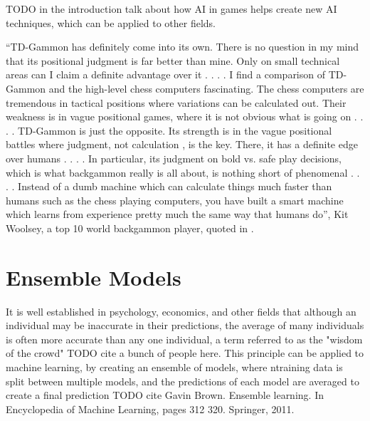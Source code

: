 TODO in the introduction talk about how AI in games helps create new AI techniques, which can be applied to other fields.

“TD-Gammon has definitely come into its own. There is no question in my mind that its positional judgment is far better than mine.
Only on small technical areas can I claim a definite advantage over
it . . . . I find a comparison of TD-Gammon and the high-level chess
computers fascinating. The chess computers are tremendous in
tactical positions where variations can be calculated out. Their
weakness is in vague positional games, where it is not obvious
what is going on . . . . TD-Gammon is just the opposite. Its strength
is in the vague positional battles where judgment, not calculation ,
is the key. There, it has a definite edge over humans . . . . In particular, its judgment on bold vs. safe play decisions, which is what
backgammon really is all about, is nothing short of phenomenal . . . .
Instead of a dumb machine which can calculate things much faster
than humans such as the chess playing computers, you have built
a smart machine which learns from experience pretty much the
same way that humans do”, Kit Woolsey, a top 10 world backgammon player, quoted in \cite{Tesauro1995}.



\section{Ensemble Models}
It is well established in psychology, economics, and other fields that although an individual may be inaccurate in their predictions, the average of many individuals is often more accurate than any one individual, a term referred to as the "wisdom of the crowd" TODO cite a bunch of people here.
This principle can be applied to machine learning, by creating an ensemble of models, where ntraining data is split between multiple models, and the predictions of each model are averaged to create a final prediction TODO cite Gavin Brown. Ensemble learning. In Encyclopedia of Machine Learning, pages 312 320. Springer, 2011. 
